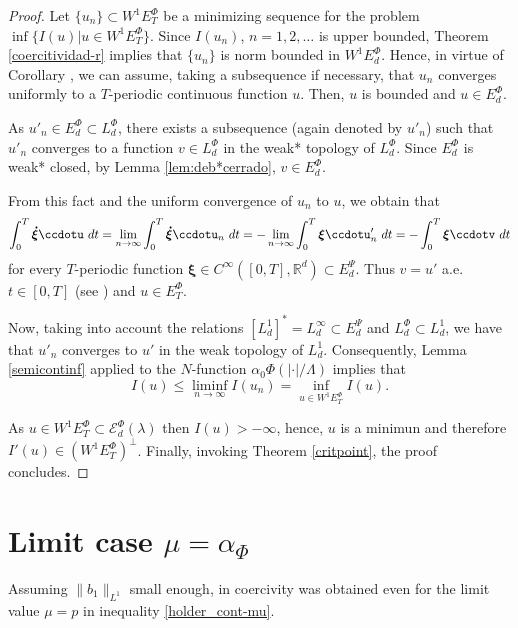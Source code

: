 \documentclass[twoside]{article}
\theoremstyle{remark}
\newcommand{\lphi}{L^{\Phi}}
\newcommand{\ephi}{E^{\Phi}}
\newcommand{\wphiet}{W^{1}\ephi_T}
\newcommand{\wphie}{W^{1}\ephi}
\newcommand{\domi}{\mathcal{E}^{\Phi}_d(\lambda)}
\renewcommand{\b}[1]{\boldsymbol{#1}}
\newcommand{\rr}{\mathbb{R}}
\newcommand{\ccdot}{\b{\cdot}}
\renewcommand{\leq}{\leqslant}
\newcommand{\epsi}{E^{\Psi}}
\begin{document}
\begin{proof}



Let $\{u_n\}\subset \wphiet$  be a  minimizing sequence for the problem  $\inf\{I(u)|u\in\wphiet\}$.
Since  $I(u_n)$, $n=1,2,\ldots$  is upper bounded, Theorem \ref{coercitividad-r}  implies that $\{u_n\}$ is norm bounded in $\wphie_d$. Hence, in virtue of Corollary \cite[Corollary 2.2]{ABGMS2015}, we can assume, taking a subsequence if necessary, that $u_n$ converges uniformly to a $T$-periodic continuous function $u$.
Then, $u$ is bounded and $u \in \ephi_d$.

As $u'_n \in \ephi_d\subset \lphi_d$,
there exists a subsequence (again denoted by $u'_n$) such that $u'_n$ converges to a function $v\in\lphi_d$ in the weak* topology of $\lphi_d$.
Since $\ephi_d$ is weak* closed, by Lemma \ref{lem:deb*cerrado}, $v\in \ephi_d$.

From this fact and the uniform convergence of $u_n$ to $u$, we obtain that
\[
\int_0^T\b{\dot{\xi}}\ccdotu\ dt=\lim_{n\to\infty}\int_0^T\b{\dot{\xi}}\ccdotu_n \ dt=-\lim_{n\to\infty}\int_0^T\b{\xi}\ccdotu'_n\ dt=-\int_0^T\b{\xi}\ccdotv\ dt
\]
for every $T$-periodic function $\b{\xi}\in C^{\infty}([0,T],\rr^d)\subset\epsi_d$.
Thus $v=u'$ a.e. $t\in [0,T]$ (see \cite[p. 6]{mawhin2010critical}) and $u\in\ephi_T$.

Now, taking into account the relations $\left[L^1_d\right]^*=L^{\infty}_d\subset  \epsi_d$ and $\lphi_d\subset L^1_d$, we have that $u'_n$ converges to $u'$ in the weak topology of $L^1_d$. Consequently,  Lemma \ref{semicontinf} applied to the $N$-function $\alpha_0\Phi\left(|\ccdot|/\Lambda\right)$ implies that
\[I(u)\leq  \liminf_{n\to\infty}I(u_n)=\inf\limits_{u\in\wphie_T}I(u).\]

As $u\in \wphiet\subset \domi$ then $I(u)>-\infty$, hence, $u$ is a minimun and therefore  $I'(u)\in (\wphiet)^{\perp}$. Finally,
invoking Theorem \ref{critpoint},  the proof concludes.\end{proof}



 \section{Limit case $\mu=\alpha_{\Phi}$}
Assuming $\|b_1\|_{L^1}$  small enough, in  \cite{zhao2004periodic, tang2010periodic} 
coercivity  was obtained even  for the limit value $\mu=p$ in inequality \eqref{holder_cont-mu}.  
\end{document}
